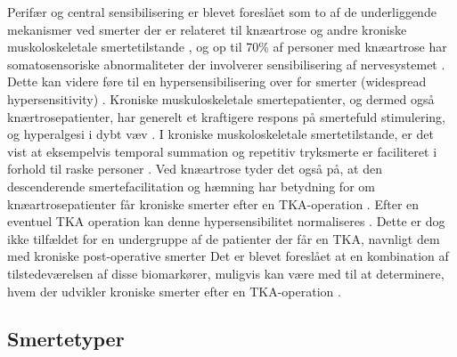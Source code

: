 {{Perifær og central sensibilisering er blevet foreslået som to af de underliggende mekanismer ved smerter der er relateret til knæartrose og andre kroniske muskoloskeletale smertetilstande \citep{sensitiziaionSten}, og op til 70\% af personer med knæartrose har somatosensoriske abnormaliteter der involverer sensibilisering af nervesystemet \citep{lars}. Dette kan videre føre til en  hypersensibilisering over for smerter (widespread hypersensitivity)  \citep{kristian}.  Kroniske muskuloskeletale smertepatienter, og dermed også knærtrosepatienter, har generelt et kraftigere respons på smertefuld stimulering, og hyperalgesi i dybt væv \citep{sensitiziaionSten}. I kroniske muskoloskeletale smertetilstande, er det vist at eksempelvis temporal summation og repetitiv tryksmerte er faciliteret i forhold til raske personer \citep{widespread}. Ved knæartrose tyder det også på, at den descenderende smertefacilitation og hæmning har betydning for om knæartrosepatienter får kroniske smerter efter en TKA-operation \citep{kristian}. Efter en eventuel TKA operation kan denne hypersensibilitet normaliseres \citep{kristian} \citep{graven}. Dette er dog ikke tilfældet for en undergruppe af de patienter der får en TKA, navnligt dem med kroniske post-operative smerter \citep{kristian}
Det er blevet foreslået at en kombination af tilstedeværelsen af disse biomarkører, muligvis kan være med til at determinere, hvem der udvikler kroniske smerter efter en TKA-operation \citep{kristian}.


\subsection{Smertetyper}


}}
